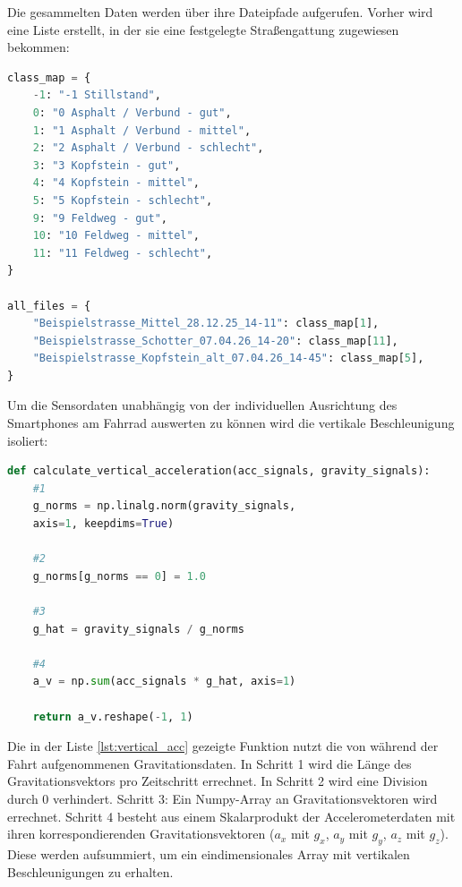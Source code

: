 Die gesammelten Daten werden über ihre Dateipfade aufgerufen. Vorher wird eine Liste erstellt, in der sie eine festgelegte Straßengattung zugewiesen bekommen:

\begin{lstlisting}[language=Python, caption={Zuweisung der Messfahrten zu den jeweiligen Straßenbelagsklassen (Ausschnitt).}, label={lst:data_mapping}]
class_map = {
    -1: "-1 Stillstand",
    0: "0 Asphalt / Verbund - gut",
    1: "1 Asphalt / Verbund - mittel",
    2: "2 Asphalt / Verbund - schlecht",
    3: "3 Kopfstein - gut",
    4: "4 Kopfstein - mittel",
    5: "5 Kopfstein - schlecht",
    9: "9 Feldweg - gut",
    10: "10 Feldweg - mittel",
    11: "11 Feldweg - schlecht",
}

all_files = {
    "Beispielstrasse_Mittel_28.12.25_14-11": class_map[1],
    "Beispielstrasse_Schotter_07.04.26_14-20": class_map[11],
    "Beispielstrasse_Kopfstein_alt_07.04.26_14-45": class_map[5],
}
\end{lstlisting}

Um die Sensordaten unabhängig von der individuellen Ausrichtung des Smartphones am Fahrrad auswerten zu können wird die vertikale Beschleunigung isoliert:
 
\begin{lstlisting}[language=Python, caption={Berechnung der reinen vertikalen Beschleunigung durch Projektion auf den Schwerevektor.}, label={lst:vertical_acc}]
def calculate_vertical_acceleration(acc_signals, gravity_signals):
    #1
    g_norms = np.linalg.norm(gravity_signals,
    axis=1, keepdims=True)

    #2
    g_norms[g_norms == 0] = 1.0

    #3
    g_hat = gravity_signals / g_norms
    
    #4
    a_v = np.sum(acc_signals * g_hat, axis=1)

    return a_v.reshape(-1, 1)
\end{lstlisting}

Die in der Liste \ref{lst:vertical_acc} gezeigte Funktion nutzt die von während der Fahrt aufgenommenen Gravitationsdaten. In Schritt 1 wird die Länge des Gravitationsvektors pro Zeitschritt errechnet. In Schritt 2 wird eine Division durch 0 verhindert. Schritt 3: Ein Numpy-Array an Gravitationsvektoren wird errechnet. Schritt 4 besteht aus einem Skalarprodukt der Accelerometerdaten mit ihren korrespondierenden Gravitationsvektoren ($a_x$ mit $g_x$, $a_y$ mit $g_y$, $a_z$ mit $g_z$). Diese werden aufsummiert, um ein eindimensionales Array mit vertikalen Beschleunigungen zu erhalten.

